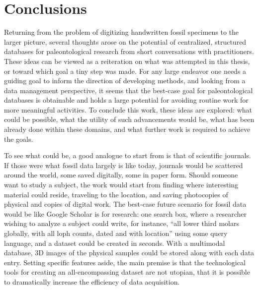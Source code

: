 \documentclass[english,twoside,openright]{UH_DS_MSc}
\begin{document}
\chapter{Conclusions}

Returning from the problem of digitizing handwritten fossil specimens to the larger picture, several thoughts arose on the potential of centralized, structured databases for paleontological research from short conversations with practitioners.
These ideas can be viewed as a reiteration on what was attempted in this thesis, or toward which goal a tiny step was made. For any large endeavor one needs a guiding goal to inform the direction of developing methods, and looking from a data management perspective, it seems that the best-case goal for paleontological databases is obtainable and holds a large potential for avoiding routine work for more meaningful activities. To conclude this work, these ideas are explored: what could be possible, what the utility of such advancements would be, what has been already done within these domains, and what further work is required to achieve the goals.

To see what could be, a good analogue to start from is that of scientific journals. If those were what fossil data largely is like today, journals would be scattered around the world, some saved digitally, some in paper form. Should someone want to study a subject, the work would start from finding where interesting material could reside, traveling to the location, and saving photocopies of physical and copies of digital work. The best-case future scenario for fossil data would be like Google Scholar is for research: one search box, where a researcher wishing to analyze a subject could write, for instance, ``all lower third molars globally, with all loph counts, dated and with location'' using some query language, and a dataset could be created in seconds. With a multimodal database, 3D images of the physical samples could be stored along with each data entry. Setting specific features aside, the main premise is that the technological tools for creating an all-encompassing dataset are not utopian, that it is possible to dramatically increase the efficiency of data acquisition.
\end{document}
